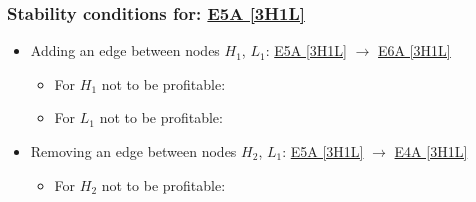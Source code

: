 

\subsubsection{Stability conditions for: \hyperref[apx:E5A:3H1L]{E5A [3H1L]}}
\label{apx:E5A:3H1L_stability_cond}

\begin{itemize}

	\item Adding an edge between nodes $H_1$, $L_1$: \hyperref[apx:E5A:3H1L]{E5A [3H1L]} $\to$ \hyperref[apx:E6A:3H1L]{E6A [3H1L]}

	\begin{itemize}

		\item For $H_1$ not to be profitable:


		\item For $L_1$ not to be profitable:


	\end{itemize}

	\item Removing an edge between nodes $H_2$, $L_1$: \hyperref[apx:E5A:3H1L]{E5A [3H1L]} $\to$ \hyperref[apx:E4A:3H1L]{E4A [3H1L]}

	\begin{itemize}

		\item For $H_2$ not to be profitable:



\end{itemize}
\end{itemize}
